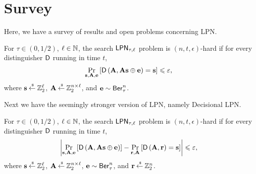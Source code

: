 \section{Survey}
Here, we have a survey of results and open problems concerning LPN.

\begin{definition}
	For $\tau \in (0,1/2)$, $\ell \in {\mathbb N}$, the search $\mathsf{LPN}_{\tau, \ell}$ problem is $(n, t, \epsilon)$-hard if for every distinguisher $\mathsf{D}$ running in time $t$,
	\begin{align*}
		\underset{\mathbf{s}, \mathbf{A}, \mathbf{e}}{\mathop{\mathrm{Pr}}}\left[\mathsf{D}\left(\mathbf{A}, \mathbf{As}\oplus\mathbf{e}\right)=\mathbf{s}\right] \leqslant \varepsilon,
	\end{align*}
	where $\mathbf{s} \mathbin{\stackrel{\mbox{\,\tiny \$}}{\gets}} {\mathbb Z}^\ell_2$, $\mathbf{A} \mathbin{\stackrel{\mbox{\,\tiny \$}}{\gets}} {\mathbb Z}^{n\times \ell}_2$, and $\mathbf{e} \sim \mathsf{Ber}^n_\tau$.
\end{definition}
Next we have the seemingly stronger version of LPN, namely Decisional LPN.
\begin{definition}
	For $\tau \in (0,1/2)$, $\ell \in {\mathbb N}$, the search $\mathsf{LPN}_{\tau, \ell}$ problem is $(n, t, \epsilon)$-hard if for every distinguisher $\mathsf{D}$ running in time $t$,
	\begin{align*}
	\abs{\underset{\vec{s}, \vec{A}, \vec{e}}{\pr}\left[\pred{D}\left(\vec{A}, \vec{As}\xor\vec{e}\right)\right] -
	\underset{\vec{r}, \vec{A}}{\pr}\left[\pred{D}\left(\vec{A}, \vec{r} \right)=\vec{s}\right] } \leq \epsilon,
	\end{align*}
	where $\mathbf{s} \mathbin{\stackrel{\mbox{\,\tiny \$}}{\gets}} {\mathbb Z}^\ell_2$, $\mathbf{A} \mathbin{\stackrel{\mbox{\,\tiny \$}}{\gets}} {\mathbb Z}^{n\times \ell}_2$, $\mathbf{e} \sim \mathsf{Ber}^n_\tau$, and $\mathbf{r}\mathbin{\stackrel{\mbox{\,\tiny \$}}{\gets}}{\mathbb Z}^n_2$.
\end{definition}

